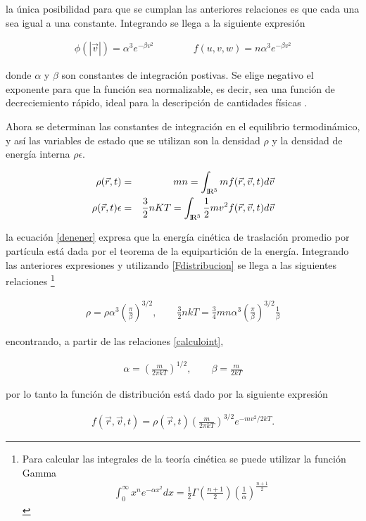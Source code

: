 \begin{itemize}
    la única posibilidad para que se cumplan las anteriores relaciones es que cada una sea igual a una constante. Integrando se llega a la siguiente expresión 
    
    \begin{eqnarray}
    \label{Fdistribucion}
    \phi(|\vec{v}|) = \alpha^{3} e^{-\beta v^{2}} \qquad\qquad  f(u,v,w) = n\alpha^{3}e^{-\beta v^{2}}
    \end{eqnarray}
    
    donde $\alpha$ y $\beta$ son constantes de integración postivas. Se elige negativo el exponente para que la función sea normalizable, es decir, sea una función de decreciemiento rápido, ideal para la descripción de cantidades físicas \cite{strichartz}.
    
    Ahora se determinan las constantes de integración en el equilibrio termodinámico, y así las variables de estado que se  utilizan son la densidad $\rho$ y la densidad de energía interna $\rho\epsilon$. 
    
    \begin{eqnarray}
    \label{rho}
    \rho(\vec{r},t) &=& mn = \int_{{\rm I\!R^{3}}}mf(\vec{r},\vec{v},t)d\vec{v}\\
    \label{denener}
    \rho(\vec{r},t)\epsilon &=& \frac{3}{2}nKT=\int_{{\rm I\!R^{3}}}\frac{1}{2}mv^{2}f(\vec{r},\vec{v},t)d\vec{v}
    \end{eqnarray}
    
    la ecuación \eqref{denener} expresa que la energía cinética de traslación promedio  por partícula está dada por el teorema de la equipartición de la energía. Integrando las anteriores expresiones y utilizando \eqref{Fdistribucion} se llega a las siguientes relaciones \footnote{Para calcular las integrales de la teoría cinética se puede utilizar la función Gamma 
    \begin{eqnarray}
    \int_{0}^{\infty}x^{n}e^{-\alpha x^{2}}dx = \frac{1}{2}\Gamma\left(\frac{n+1}{2}\right)\left(\frac{1}{\alpha}\right)^{\frac{n+1}{2}}
    \end{eqnarray}
     }
     
     \begin{eqnarray}
     \label{calculoint}
     \rho = \rho\alpha^{3}\left(\frac{\pi}{\beta}\right)^{3/2} , \qquad \frac{3}{2}nkT =\frac{3}{4}mn\alpha^{3}\left(\frac{\pi}{\beta}\right)^{3/2} \frac{1}{\beta}
     \end{eqnarray}
     
     encontrando,  a partir de las relaciones \eqref{calculoint},
     
     \begin{eqnarray}
     \boxed{
     \alpha = \left(\frac{m}{2\pi kT}\right)^{1/2}, \qquad \beta=\frac{m}{2kT}
     }
     \end{eqnarray}
    
    
    por lo tanto la función de distribución está dado por la siguiente expresión 
    
    \begin{eqnarray}
    f(\vec{r},\vec{v},t) = \rho(\vec{r},t)\left(\frac{m}{2\pi kT}\right)^{3/2}e^{-mv^{2}/2kT}.
    \end{eqnarray}

\end{itemize}

